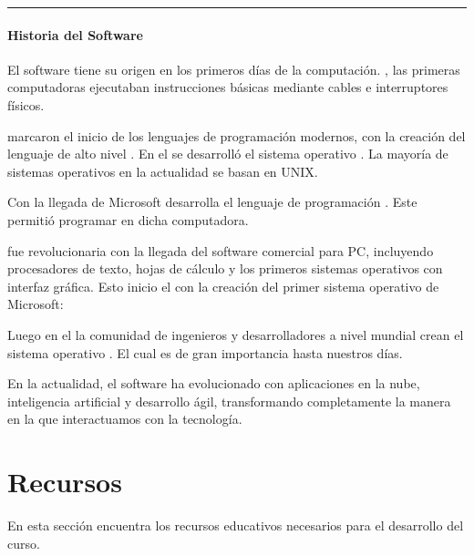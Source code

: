 \documentclass[letterpaper,10pt,spanish]{sphinxmanual}
\begin{document}
\bigskip\hrule\bigskip



\paragraph{Historia del Software}
\label{\detokenize{cursos/informatica10/periodo01/R01:historia-del-software}}
\sphinxAtStartPar
El software tiene su origen en los primeros días de la computación. , las primeras computadoras ejecutaban instrucciones básicas mediante cables e interruptores físicos.

\sphinxAtStartPar
{} marcaron el inicio de los lenguajes de programación modernos, con la creación del lenguaje de alto nivel . En el  se desarrolló el sistema operativo . La mayoría de sistemas operativos en la actualidad se basan en UNIX.

\sphinxAtStartPar
Con la llegada de  Microsoft desarrolla el lenguaje de programación . Este permitió programar en dicha computadora.

\sphinxAtStartPar
{} fue revolucionaria con la llegada del software comercial para PC, incluyendo procesadores de texto, hojas de cálculo y los primeros sistemas operativos con interfaz gráfica. Esto inicio el  con la creación del primer sistema operativo de Microsoft: 

\sphinxAtStartPar
Luego en el  la comunidad de ingenieros y desarrolladores a nivel mundial crean el sistema operativo . El cual es de gran importancia hasta nuestros días.

\sphinxAtStartPar
En la actualidad, el software ha evolucionado con aplicaciones en la nube, inteligencia artificial y desarrollo ágil, transformando completamente la manera en la que interactuamos con la tecnología.

\sphinxstepscope


\section{Recursos}
\label{\detokenize{cursos/informatica10/recursos/index:recursos}}\label{\detokenize{cursos/informatica10/recursos/index::doc}}
\sphinxAtStartPar
En esta sección encuentra los recursos educativos necesarios para el desarrollo del curso.
\end{document}
